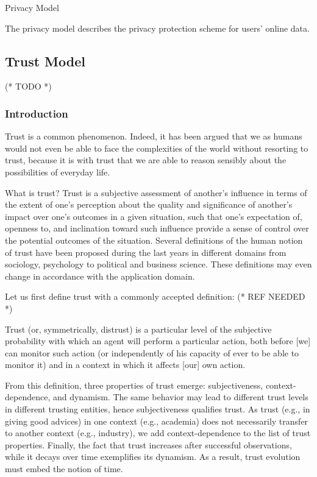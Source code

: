 \documentclass{article}
\begin{document}
Privacy Model



The privacy model describes the privacy protection scheme for users{'} online data.


\subsection{Trust Model}



(* TODO *)


\subsubsection{Introduction}



Trust is a common phenomenon. Indeed, it has been argued that we as humans would not even be able to face the complexities of the world without resorting
to trust, because it is with trust that we are able to reason sensibly about the possibilities of everyday life.



What is trust? Trust is a subjective assessment of another's influence in terms of the extent of one's perception about the quality and significance
of another's impact over one's outcomes in a given situation, such that one's expectation of, openness to, and inclination toward such influence
provide a sense of control over the potential outcomes of the situation. Several definitions of the human notion of trust have been proposed during
the last years in different domains from sociology, psychology to political and business science. These definitions may even change in accordance
with the application domain.



 Let us first define trust with a commonly accepted definition: (* REF NEEDED *)



Trust (or, symmetrically, distrust) is a particular level of the subjective probability with which an agent will perform a particular action, both
before [we] can monitor such action (or independently of his capacity of ever to be able to monitor it) and in a context in which it affects [our]
own action.



From this definition, three properties of trust emerge: subjectiveness, context-dependence, and dynamism. The same behavior may lead to different
trust levels in different trusting entities, hence subjectiveness qualifies trust. As trust (e.g., in giving good advices) in one context (e.g.,
academia) does not necessarily transfer to another context (e.g., industry), we add context-dependence to the list of trust properties. Finally,
the fact that trust increases after successful observations, while it decays over time exemplifies its dynamism. As a result, trust evolution must
embed the notion of time.
\end{document}
